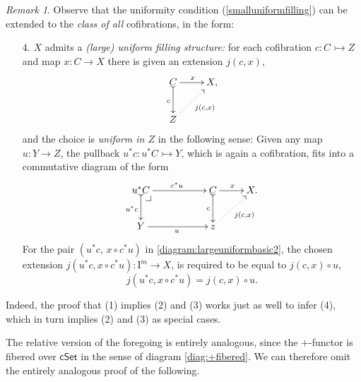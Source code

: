 \documentclass[11pt,reqno]{amsart}
\makeatletter
\newcommand{\cSet}{\ensuremath{\mathsf{cSet}}}
\newcommand{\mono}{\ensuremath{\rightarrowtail}}
\newcommand{\ra}{\ensuremath{\rightarrow}}
\newcommand{\I}{\ensuremath{\mathrm{I}}}
\theoremstyle{remark}
\newtheorem{remark}[theorem]{Remark}
\theoremstyle{definition}
\newcommand{\pbcorner}[1][dr]{\save*!/#1-1.2pc/#1:(-1,1)@^{|-}\restore}
\makeatother
\begin{document}
 \begin{remark}\label{remark:largeuniformfilling}
 Observe that the uniformity condition (\ref{smalluniformfilling}) can be extended to the \emph{class of all} cofibrations, in the form:
 
 \begin{enumerate}
 \item[4.]\label{largeuniformfilling} $X$ admits a \emph{(large) uniform filling structure:} 
for each cofibration $c : C \mono Z$ and map $x : C\ra X$ there is given an extension $j(c,x)$,
\begin{equation}\label{diagram:largeuniformbasic}
\xymatrix{
C \ar@{>->}[d]_{c} \ar[r]^{x} & X, \\
Z\ar@{.>}[ru]_{j(c,x)} &
}
\end{equation}
and the choice is \emph{uniform in $Z$} in the following sense:
Given any map $u :Y \ra Z$, the pullback $u^*c : u^*C\mono Y$, which is again a cofibration, fits into a commutative diagram of the form
\begin{equation}\label{diagram:largeuniformbasic2}
\xymatrix{
u^*C \ar@{>->}[d]_{u^*c} \ar[rr]^{c^*u} \pbcorner &&  C \ar@{>->}[d]_{c} \ar[r]^{x} & X. \\
Y \ar[rr]_{u} && z \ar@{.>}[ru]_{j(c,x)} &
}
\end{equation}
For the pair $(u^*c,\, x\circ c^*u)$ in \eqref{diagram:largeuniformbasic2}, the chosen extension $j(u^*c,x\circ c^*u): \I^m \ra X$, is required to be equal to  $j(c,x)\circ u$,
\begin{equation}\label{eq:largeuniformfillers}
j(u^*c,x\circ c^*u) = j(c,x) \circ u.
\end{equation}
\end{enumerate}
Indeed, the proof that (1) implies (2) and (3) works just as well to infer (4), which in turn implies (2) and (3) as special cases.
\end{remark}

The relative version of the foregoing is entirely analogous, since the $+$-functor is fibered over $\cSet$ in the sense of diagram \eqref{diag:+fibered}.  We can therefore omit the entirely analogous proof of the following.
 
\end{document}
